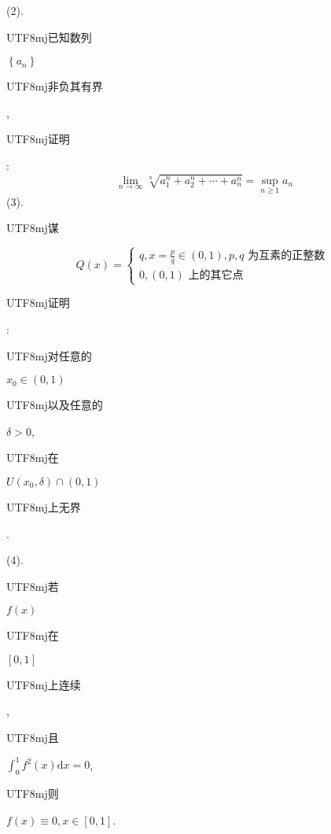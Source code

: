 \documentclass[10pt]{article}
\begin{document}
(2). \begin{CJK}{UTF8}{mj}已知数列\end{CJK} $\left\{a_{n}\right\}$ \begin{CJK}{UTF8}{mj}非负其有界\end{CJK}, \begin{CJK}{UTF8}{mj}证明\end{CJK}:
$$
\lim _{n \rightarrow \infty} \sqrt[n]{a_{1}^{n}+a_{2}^{n}+\cdots+a_{n}^{n}}=\sup _{n \geq 1} a_{n}
$$
(3). \begin{CJK}{UTF8}{mj}谋\end{CJK}
$$
Q(x)=\left\{\begin{array}{l}
q, x=\frac{p}{q} \in(0,1), p, q \text { 为互素的正整数 } \\
0,(0,1) \text { 上的其它点 }
\end{array}\right.
$$
\begin{CJK}{UTF8}{mj}证明\end{CJK}: \begin{CJK}{UTF8}{mj}对任意的\end{CJK} $x_{0} \in(0,1)$ \begin{CJK}{UTF8}{mj}以及任意的\end{CJK} $\delta>0$, \begin{CJK}{UTF8}{mj}在\end{CJK} $U\left(x_{0}, \delta\right) \cap(0,1)$ \begin{CJK}{UTF8}{mj}上无界\end{CJK}.

(4). \begin{CJK}{UTF8}{mj}若\end{CJK} $f(x)$ \begin{CJK}{UTF8}{mj}在\end{CJK} $[0,1]$ \begin{CJK}{UTF8}{mj}上连续\end{CJK}, \begin{CJK}{UTF8}{mj}且\end{CJK} $\int_{0}^{1} f^{2}(x) \mathrm{d} x=0$, \begin{CJK}{UTF8}{mj}则\end{CJK} $f(x) \equiv 0, x \in[0,1]$.
\end{document}
